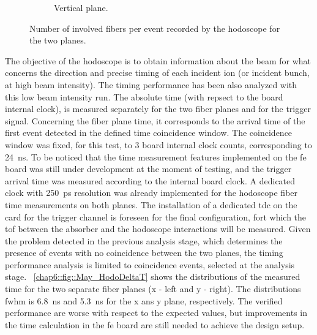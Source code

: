 \begin{figure}
\begin{subfigure}[t]{.5\textwidth}
\caption{Vertical plane.}
\label{chap6::fig::May_HodoClusY}
\end{subfigure}
\caption{Number of involved fibers per event recorded by the hodoscope for the two planes.}
\label{chap6::fig::May_HodoClusters}
\end{figure}

The objective of the hodoscope is to obtain information about the beam for what concerns the direction and precise timing of each incident ion (or incident bunch, at high beam intensity). The timing performance has been also analyzed with this low beam intensity run. The absolute time (with repsect to the board internal clock), is measured separately for the two fiber planes and for the trigger signal. Concerning the fiber plane time, it corresponds to the arrival time of the first event detected in the defined time coincidence window. The coincidence window was fixed, for this test, to 3 board internal clock counts, corresponding to 24~ns. To be noticed that the time measurement features implemented on the \gls{fe} board was still under development at the moment of testing, and the trigger arrival time was measured according to the internal board clock. A dedicated clock with 250~ps resolution was already implemented for the hodoscope fiber time measurements on both planes. The installation of a dedicated \gls{tdc} on the card for the trigger channel is foreseen for the final configuration, fort which the \gls{tof} between the absorber and the hodoscope interactions will be measured. Given the problem detected in the previous analysis stage, which determines the presence of events with no coincidence between the two planes, the timing performance analysis is limited to coincidence events, selected at the analysis stage.
\figurename~\ref{chap6::fig::May_HodoDeltaT} shows the distributions of the measured time for the two separate fiber planes (x - left and y - right). The distributions \gls{fwhm} is 6.8~ns and 5.3~ns for the x ans y plane, respectively. The verified performance are worse with respect to the expected values, but improvements in the time calculation in the \gls{fe} board are still needed to achieve the design setup. 

